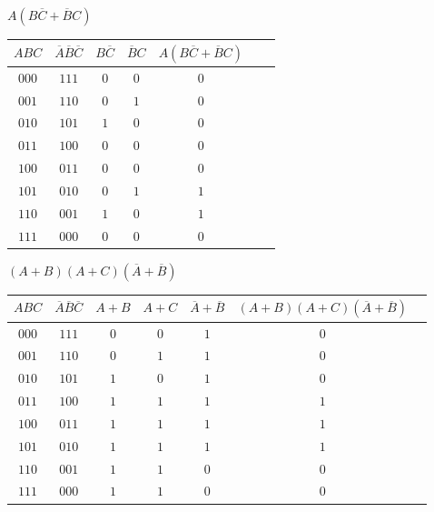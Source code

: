 \documentclass[12pt,largemargins]{homework}
\begin{document}
\begin{alphaparts}
\begin{tabular}{|c|c|c|c|c|c|c|c|}
\end{tabular}
\newpage
\item
$A(B\overline{C} + \overline{B}C)$ \\

\begin{tabular}{|c|c|c|c|c|c|c|}
\hline
$ABC$ & $\overline{A}\overline{B}\overline{C}$ & $B\overline{C}$ & $\overline{B}C$ & $A(B\overline{C} + \overline{B}C)$ \\
\hline
$000$ & $111$ & $ 0 $ & $ 0$ & $ 0$ \\
$001$ & $110$ & $ 0 $ & $ 1$ & $ 0$ \\
$010$ & $101$ & $ 1 $ & $ 0$ & $ 0$ \\
$011$ & $100$ & $ 0 $ & $ 0$ & $ 0$ \\
$100$ & $011$ & $ 0 $ & $ 0$ & $ 0$ \\
$101$ & $010$ & $ 0 $ & $ 1$ & $ 1$ \\
$110$ & $001$ & $ 1 $ & $ 0$ & $ 1$ \\
$111$ & $000$ & $ 0 $ & $ 0$ & $ 0$ \\
\hline

\end{tabular}
\item
$(A+B)(A+C)(\overline{A}+\overline{B})$\\

\begin{tabular}{|c|c|c|c|c|c|c|}
\hline
$ABC$ & $\overline{A}\overline{B}\overline{C}$ & $A + B$ & $A+C$ & $\overline{A}+\overline{B}$ & $(A+B)(A+C)(\overline{A}+\overline{B})$\\
\hline
$000$ & $111$ & $ 0 $ & $ 0$ & $ 1$ & $ 0$ \\
$001$ & $110$ & $ 0 $ & $ 1$ & $ 1$ & $ 0$ \\
$010$ & $101$ & $ 1 $ & $ 0$ & $ 1$ & $ 0$ \\
$011$ & $100$ & $ 1 $ & $ 1$ & $ 1$ & $ 1$ \\
$100$ & $011$ & $ 1 $ & $ 1$ & $ 1$ & $ 1$ \\
$101$ & $010$ & $ 1 $ & $ 1$ & $ 1$ & $ 1$ \\
$110$ & $001$ & $ 1 $ & $ 1$ & $ 0$ & $ 0$ \\
$111$ & $000$ & $ 1 $ & $ 1$ & $ 0$ & $ 0$ \\
\hline

\end{tabular}
\end{alphaparts}
\end{document}
